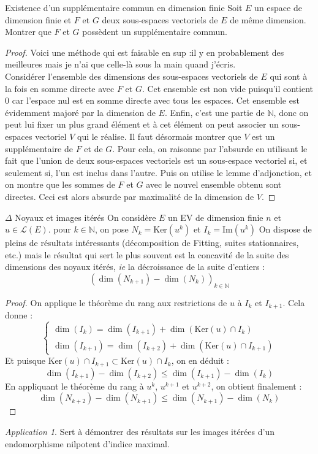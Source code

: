 \documentclass[french,a4paper]{article}
\newcommand{\N}{\mathbb{N}}
\renewcommand{\ker}{\text{Ker}}
\theoremstyle{plain}
\theoremstyle{definition}
\theoremstyle{remark}
\newtheorem*{app}{Application}
\begin{document}
\begin{ex}{Existence d'un supplémentaire commun en dimension finie}
	Soit $E$ un espace de dimension finie et $F$ et $G$ deux sous-espaces vectoriels de $E$ de même dimension. Montrer que $F$ et $G$ possèdent un supplémentaire commun.
\end{ex}
\begin{proof}
	Voici une méthode qui est faisable en sup :il y en probablement des meilleures mais je n'ai que celle-là sous la main quand j'écris. \\
	Considérer l'ensemble des dimensions des sous-espaces vectoriels de $E$ qui sont à la fois en somme directe avec $F$ et $G$. Cet ensemble est non vide puisqu'il contient 0 car l'espace nul est en somme directe avec tous les espaces. Cet ensemble est évidemment majoré par la dimension de $E$. Enfin, c'est une partie de $\N$, donc on peut lui fixer un plus grand élément et à cet élément on peut associer un sous-espaces vectoriel $V$ qui le réalise. Il faut désormais montrer que $V$ est un supplémentaire de $F$ et de $G$. Pour cela, on raisonne par l'absurde en utilisant le fait que l'union de deux sous-espaces vectoriels est un sous-espace vectoriel si, et seulement si, l'un est inclus dans l'autre. Puis on utilise le lemme d'adjonction, et on montre que les sommes de $F$ et $G$ avec le nouvel ensemble obtenu sont directes. Ceci est alors absurde par maximalité de la dimension de $V$.
\end{proof}
\begin{ex}{$\Delta$ Noyaux et images itérés} On considère $E$ un EV de dimension finie $n$ et $u\in\mathcal{L}(E)$. pour $k\in\N$, on pose $N_k=\text{Ker}(u^k)$ et $I_k=\text{Im}(u^k)$ On dispose de pleins de résultats intéressants (décomposition de Fitting, suites stationnaires, etc.) mais le résultat qui sert le plus souvent est la concavité de la suite des dimensions des noyaux itérés, \textit{ie} la décroissance de la suite d'entiers : $$(\dim(N_{k+1})-\dim(N_k))_{k\in\N}$$ 
\end{ex}
\begin{proof}
	On applique le théorème du rang aux restrictions de $u$ à $I_k$ et $I_{k+1}$. Cela donne : $$\begin{cases}
		\dim(I_k)=\dim(I_{k+1})+\dim(\ker(u)\cap I_k) \\
		\dim(I_{k+1})=\dim(I_{k+2})+\dim(\ker(u)\cap I_{k+1})
	\end{cases}$$ Et puisque $\ker(u)\cap I_{k+1}\subset \ker(u)\cap I_k$, on en déduit : $$\dim(I_{k+1})-\dim(I_{k+2})\leqslant\dim(I_{k+1})-\dim(I_k)$$ En appliquant le théorème du rang à $u^k$, $u^{k+1}$ et $u^{k+2}$, on obtient finalement : $$\dim(N_{k+2})-\dim(N_{k+1})\leqslant\dim(N_{k+1})-\dim(N_k)$$
\end{proof}
\begin{app}
	Sert à démontrer des résultats sur les images itérées d'un endomorphisme nilpotent d'indice maximal.
\end{app}
\end{document}
